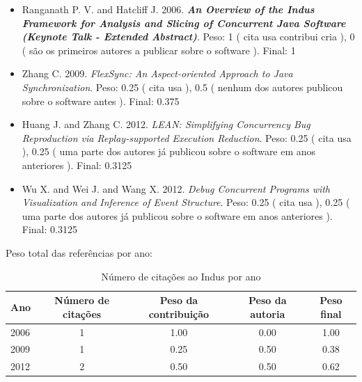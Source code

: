 \begin{itemize}
\item Ranganath P. V. and Hatcliff J.
      2006.
        \textbf{\textit{ An Overview of the Indus Framework for Analysis and Slicing of Concurrent Java Software (Keynote Talk - Extended Abstract)}}.
      Peso:
      1 (
          cita
          usa
          contribui
          cria
      ),
      0 (
são os primeiros autores a publicar sobre o software
      ).
      Final:
      1

\item Zhang C.
      2009.
        \textit{ FlexSync: An Aspect-oriented Approach to Java Synchronization}.
      Peso:
      0.25 (
          cita
          usa
      ),
      0.5 (
nenhum dos autores publicou sobre o software antes
      ).
      Final:
      0.375

\item Huang J. and Zhang C.
      2012.
        \textit{ LEAN: Simplifying Concurrency Bug Reproduction via Replay-supported Execution Reduction}.
      Peso:
      0.25 (
          cita
          usa
      ),
      0.25 (
uma parte dos autores já publicou sobre o software em anos anteriores
      ).
      Final:
      0.3125

\item Wu X. and Wei J. and Wang X.
      2012.
        \textit{ Debug Concurrent Programs with Visualization and Inference of Event Structure}.
      Peso:
      0.25 (
          cita
          usa
      ),
      0.25 (
uma parte dos autores já publicou sobre o software em anos anteriores
      ).
      Final:
      0.3125

\end{itemize}

Peso total das referências por ano:

\begin{table}[h]
\caption{Número de citações ao Indus por ano}
\centering
\begin{tabular}{| l | c | c | c | c |}
  \hline
  Ano & Número de citações & Peso da contribuição & Peso da autoria & Peso final \\
  \hline
  2006
    & 1
    & 1.00
    & 0.00
    & 1.00 \\
  2009
    & 1
    & 0.25
    & 0.50
    & 0.38 \\
  2012
    & 2
    & 0.50
    & 0.50
    & 0.62 \\
  \hline
\end{tabular}
\end{table}


